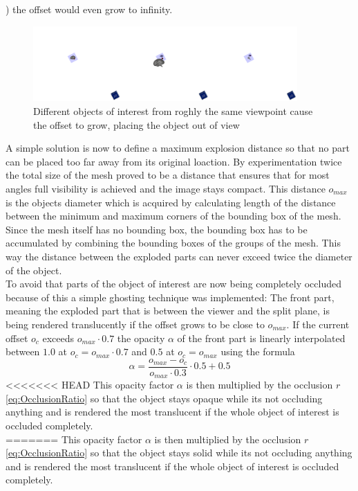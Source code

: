 ) the offset would even grow to infinity.\\
\begin{figure}[tb]
	\centering
	\includegraphics[width=0.9\textwidth]{chapters/figures/infinity}
	\caption{Different objects of interest from roghly the same viewpoint cause the offset to grow, placing the object out of view}
	\label{fig:infinity}
\end{figure}
A simple solution is now to define a maximum explosion distance so that no part can be placed too far away from its original loaction. By experimentation twice the total size of the mesh proved to be a distance that ensures that for most angles full visibility is achieved and the image stays compact. This distance $o_{max}$ is the objects diameter which is acquired by calculating length of the distance between the minimum and maximum corners of the bounding box of the mesh. Since the mesh itself has no bounding box, the bounding box has to be accumulated by combining the bounding boxes of the groups of the mesh. This way the distance between the exploded parts can never exceed twice the diameter of the object.\\
To avoid that parts of the object of interest are now being completely occluded because of this a simple ghosting technique was implemented: 
The front part, meaning the exploded part that is between the viewer and the split plane, is being rendered translucently if the offset grows to be close to $o_{max}$. 
If the current offset $o_c$ exceeds $o_{max} \cdot 0.7$ the opacity $\alpha$ of the front part is linearly interpolated between $1.0$ at $o_c = o_{max} \cdot 0.7$ and $0.5$ at  $o_c = o_{max}$ using the formula
\begin{equation}
	\alpha = \frac{o_{max}-o_c}{o_{max} \cdot 0.3} \cdot 0.5 + 0.5
\end{equation}
<<<<<<< HEAD
This opacity factor $\alpha$ is then multiplied by the occlusion $r$ \ref{eq:OcclusionRatio}  so that the object stays opaque while its not occluding anything and is rendered the most translucent if the whole object of interest is occluded completely.\\
=======
This opacity factor $\alpha$ is then multiplied by the occlusion $r$ \ref{eq:OcclusionRatio}  so that the object stays solid while its not occluding anything and is rendered the most translucent if the whole object of interest is occluded completely.\\
